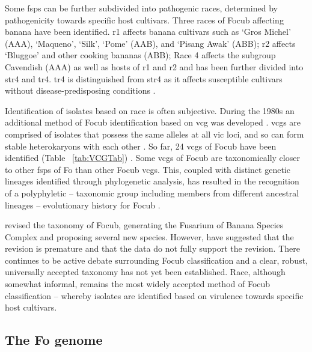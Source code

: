 Some \acp{fsp} can be further subdivided into pathogenic races, determined by pathogenicity towards specific host cultivars. Three races of \ac{Focub} affecting banana have been identified. \acf{r1}  affects banana cultivars such as ‘Gros Michel’ (AAA), ‘Maqueno’, ‘Silk’, ‘Pome’ (AAB), and ‘Pisang Awak’ (ABB); \acf{r2} affects ‘Bluggoe’ and other cooking bananas (ABB); Race 4 affects the subgroup Cavendish (AAA) as well as hosts of \ac{r1} and \ac{r2} \parencite{Ploetz2015a} and has been further divided into \ac{str4} and \acl{tr4}. \Ac{tr4} is distinguished from \ac{str4} as it affects susceptible cultivars without disease-predisposing conditions \parencite{Ploetz2015b}.  

Identification of isolates based on race is often subjective. During the 1980s an additional method of \ac{Focub} identification based on \ac{vcg} was developed \parencite{Correll1991}. \acp{vcg} are comprised of isolates that possess the same alleles at all \ac{vic} loci, and so can form stable heterokaryons with each other \parencite{Correll1991}. So far, 24 \acp{vcg} of \ac{Focub} have been identified (Table ~\ref{tab:VCGTab}) \parencite{Czislowski2018}. Some \acp{vcg} of \ac{Focub} are taxonomically closer to other \acp{fsp} of \ac{Fo} than other \ac{Focub} \acp{vcg}. This, coupled with distinct genetic lineages identified through phylogenetic analysis, has resulted in the recognition of a polyphyletic – taxonomic group including members from different ancestral lineages – evolutionary history for \ac{Focub} \parencite{Koenig1997, Ploetz2007}. 

\textcite{Maryani2019} revised the taxonomy of \ac{Focub}, generating the Fusarium of Banana Species Complex and proposing several new species. However, \textcite{Torres2021} have suggested that the revision is premature and that the data do not fully support the revision. There continues to be active debate surrounding \ac{Focub} classification and a clear, robust, universally accepted taxonomy has not yet been established. Race, although somewhat informal, remains the most widely accepted method of \ac{Focub} classification – whereby isolates are identified based on virulence towards specific host cultivars.  

\afterpage{



\clearpage
}

\subsection{The \acl{Fo} genome} 

